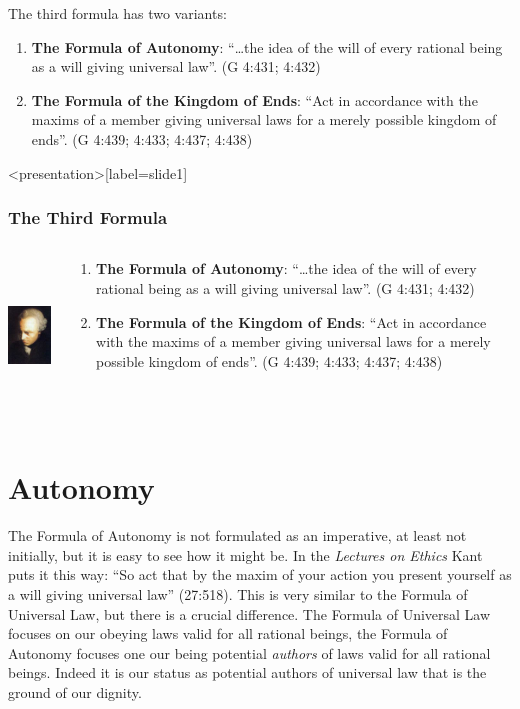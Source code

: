 The third formula has two variants:
\begin{enumerate}
    \item \textbf{The Formula of Autonomy}: ``\ldots the idea of the will of every rational being as a will giving universal law''. (G 4:431; 4:432)
    \item \textbf{The Formula of the Kingdom of Ends}: ``Act in accordance with the maxims of a member giving universal laws for a merely possible kingdom of ends''. (G 4:439; 4:433; 4:437; 4:438)
\end{enumerate}

\change

\begin{frame}<presentation>[label=slide1]
    \frametitle{The Third Formula}
        \begin{columns}
            \begin{column}{3cm}
                \includegraphics[height=4cm]{../../graphics/kant.jpg}
            \end{column}
            \begin{column}{7cm}
                \begin{enumerate}
                    \item \textbf{The Formula of Autonomy}: ``\ldots the idea of the will of every rational being as a will giving universal law''. (G 4:431; 4:432)
                    \item \textbf{The Formula of the Kingdom of Ends}: ``Act in accordance with the maxims of a member giving universal laws for a merely possible kingdom of ends''. (G 4:439; 4:433; 4:437; 4:438)
                \end{enumerate}
            \end{column}
        \end{columns}
\end{frame}

\section{Autonomy}

The Formula of Autonomy is not formulated as an imperative, at least not initially, but it is easy to see how it might be. In the \emph{Lectures on Ethics} Kant puts it this way: ``So act that by the maxim of your action you present yourself as a will giving universal law'' (27:518). This is very similar to the Formula of Universal Law, but there is a crucial difference. The Formula of Universal Law focuses on our obeying laws valid for all rational beings, the Formula of Autonomy focuses one our being potential \emph{authors} of laws valid for all rational beings. Indeed it is our status as potential authors of universal law that is the ground of our dignity.

